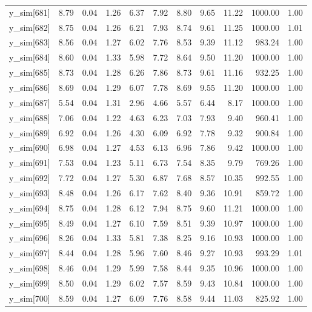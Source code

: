 \begin{table}[ht]
\begin{tabular}{rrrrrrrrrrr}
  y\_sim[681] & 8.79 & 0.04 & 1.26 & 6.37 & 7.92 & 8.80 & 9.65 & 11.22 & 1000.00 & 1.00 \\ 
  y\_sim[682] & 8.75 & 0.04 & 1.26 & 6.21 & 7.93 & 8.74 & 9.61 & 11.25 & 1000.00 & 1.01 \\ 
  y\_sim[683] & 8.56 & 0.04 & 1.27 & 6.02 & 7.76 & 8.53 & 9.39 & 11.12 & 983.24 & 1.00 \\ 
  y\_sim[684] & 8.60 & 0.04 & 1.33 & 5.98 & 7.72 & 8.64 & 9.50 & 11.20 & 1000.00 & 1.00 \\ 
  y\_sim[685] & 8.73 & 0.04 & 1.28 & 6.26 & 7.86 & 8.73 & 9.61 & 11.16 & 932.25 & 1.00 \\ 
  y\_sim[686] & 8.69 & 0.04 & 1.29 & 6.07 & 7.78 & 8.69 & 9.55 & 11.20 & 1000.00 & 1.00 \\ 
  y\_sim[687] & 5.54 & 0.04 & 1.31 & 2.96 & 4.66 & 5.57 & 6.44 & 8.17 & 1000.00 & 1.00 \\ 
  y\_sim[688] & 7.06 & 0.04 & 1.22 & 4.63 & 6.23 & 7.03 & 7.93 & 9.40 & 960.41 & 1.00 \\ 
  y\_sim[689] & 6.92 & 0.04 & 1.26 & 4.30 & 6.09 & 6.92 & 7.78 & 9.32 & 900.84 & 1.00 \\ 
  y\_sim[690] & 6.98 & 0.04 & 1.27 & 4.53 & 6.13 & 6.96 & 7.86 & 9.42 & 1000.00 & 1.00 \\ 
  y\_sim[691] & 7.53 & 0.04 & 1.23 & 5.11 & 6.73 & 7.54 & 8.35 & 9.79 & 769.26 & 1.00 \\ 
  y\_sim[692] & 7.72 & 0.04 & 1.27 & 5.30 & 6.87 & 7.68 & 8.57 & 10.35 & 992.55 & 1.00 \\ 
  y\_sim[693] & 8.48 & 0.04 & 1.26 & 6.17 & 7.62 & 8.40 & 9.36 & 10.91 & 859.72 & 1.00 \\ 
  y\_sim[694] & 8.75 & 0.04 & 1.28 & 6.12 & 7.94 & 8.75 & 9.60 & 11.21 & 1000.00 & 1.00 \\ 
  y\_sim[695] & 8.49 & 0.04 & 1.27 & 6.10 & 7.59 & 8.51 & 9.39 & 10.97 & 1000.00 & 1.00 \\ 
  y\_sim[696] & 8.26 & 0.04 & 1.33 & 5.81 & 7.38 & 8.25 & 9.16 & 10.93 & 1000.00 & 1.00 \\ 
  y\_sim[697] & 8.44 & 0.04 & 1.28 & 5.96 & 7.60 & 8.46 & 9.27 & 10.93 & 993.29 & 1.01 \\ 
  y\_sim[698] & 8.46 & 0.04 & 1.29 & 5.99 & 7.58 & 8.44 & 9.35 & 10.96 & 1000.00 & 1.00 \\ 
  y\_sim[699] & 8.50 & 0.04 & 1.29 & 6.02 & 7.57 & 8.59 & 9.43 & 10.84 & 1000.00 & 1.00 \\ 
  y\_sim[700] & 8.59 & 0.04 & 1.27 & 6.09 & 7.76 & 8.58 & 9.44 & 11.03 & 825.92 & 1.00 \\ 

\end{tabular}
\end{table}
